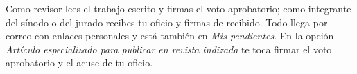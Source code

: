 \documentclass[11pt,a4paper]{article}
\begin{document}
{\small\tableofcontents}
\newpage
\begin{quevasahacer}
Como revisor lees el trabajo escrito y firmas el voto aprobatorio; como integrante del sínodo o del jurado recibes tu oficio y firmas de recibido. Todo llega por correo con enlaces personales y está también en \emph{Mis pendientes}. En la opción \emph{Artículo especializado para publicar en revista indizada} te toca firmar el voto aprobatorio y el acuse de tu oficio.
\end{quevasahacer}



\end{document}
